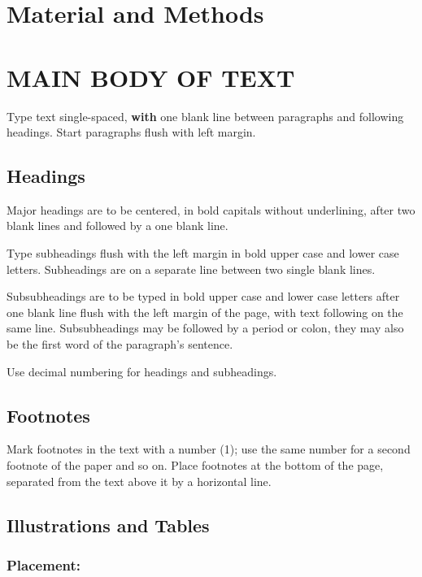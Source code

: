 \documentclass{isprs} %
\begin{document}
\section{Material and Methods}\label{sec:mat_met}


\section{MAIN BODY OF TEXT}\label{sec:MAIN BODY OF TEXT}

Type text single-spaced, \textbf{with} one blank line between paragraphs and 
following headings. Start paragraphs flush with left margin.


\subsection{Headings}\label{sec:Headings}

Major headings are to be centered, in bold capitals without 
underlining, after two blank lines and followed by a one blank line.

Type subheadings flush with the left margin in bold upper case and lower 
case letters. Subheadings are on a separate line between two single blank lines.

Subsubheadings are to be typed in bold upper case and lower case letters 
after one blank line flush with the left margin of the page, with text 
following on the same line. Subsubheadings may be followed by a period 
or colon, they may also be the first word of the paragraph's sentence.

Use decimal numbering for headings and subheadings.


\subsection{Footnotes}\label{sec:Footnotes}

Mark footnotes in the text with a number (1); use the same number for a 
second footnote of the paper and so on. Place footnotes at the bottom of 
the page, separated from the text above it by a horizontal line.


\subsection{Illustrations and Tables}\label{sec:Illustrations and Tables}

\subsubsection{Placement:}\label{sec:Placement}
\end{document}
